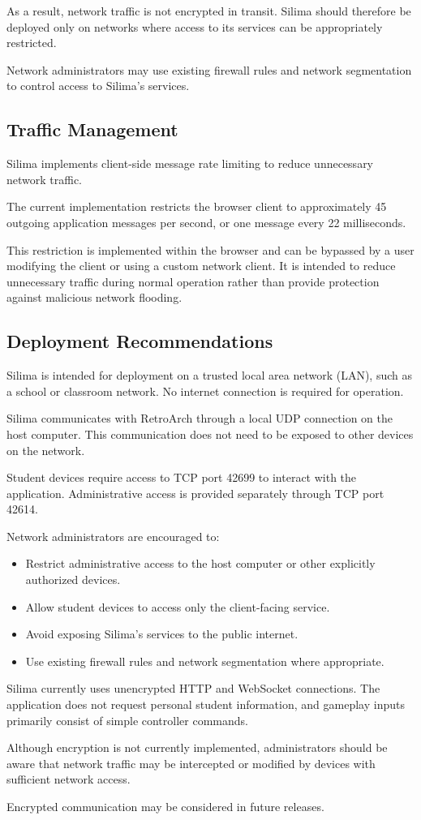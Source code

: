 As a result, network traffic is not encrypted in transit.
Silima should therefore be deployed only on networks where
access to its services can be appropriately restricted.

Network administrators may use existing firewall rules
and network segmentation to control access to Silima's
services.

\subsection{Traffic Management}

Silima implements client-side message rate limiting to
reduce unnecessary network traffic.

The current implementation restricts the browser client
to approximately 45 outgoing application messages per
second, or one message every 22 milliseconds.

This restriction is implemented within the browser and
can be bypassed by a user modifying the client or using
a custom network client. It is intended to reduce
unnecessary traffic during normal operation rather than
provide protection against malicious network flooding.


\subsection{Deployment Recommendations}

Silima is intended for deployment on a trusted local area
network (LAN), such as a school or classroom network.
No internet connection is required for operation.

Silima communicates with RetroArch through a local UDP
connection on the host computer. This communication does
not need to be exposed to other devices on the network.

Student devices require access to TCP port 42699 to
interact with the application. Administrative access
is provided separately through TCP port 42614.

Network administrators are encouraged to:
\begin{itemize}
    \item Restrict administrative access to the host
          computer or other explicitly authorized devices.
    \item Allow student devices to access only the
          client-facing service.
    \item Avoid exposing Silima's services to the
          public internet.
    \item Use existing firewall rules and network
          segmentation where appropriate.
\end{itemize}

Silima currently uses unencrypted HTTP and WebSocket
connections. The application does not request personal
student information, and gameplay inputs primarily
consist of simple controller commands.

Although encryption is not currently implemented,
administrators should be aware that network traffic
may be intercepted or modified by devices with
sufficient network access.

Encrypted communication may be considered in future
releases.
